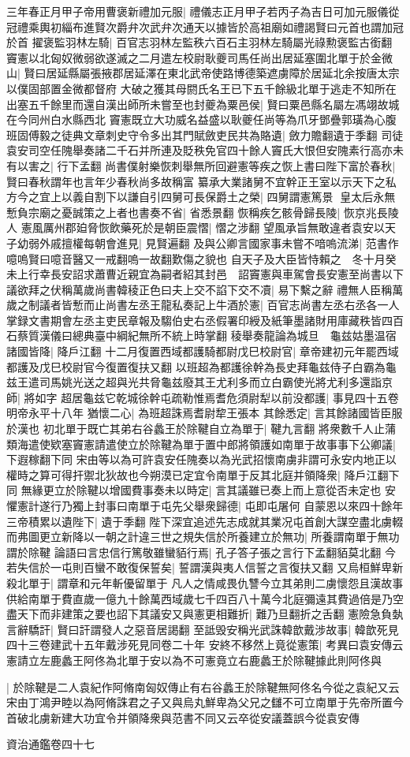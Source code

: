 三年春正月甲子帝用曹褒新禮加元服|{
	禮儀志正月甲子若丙子為吉日可加元服儀從冠禮乘輿初緇布進賢次爵弁次武弁次通天以據皆於高祖廟如禮謁賢曰元首也謂加冠於首}
擢褒監羽林左騎|{
	百官志羽林左監秩六百石主羽林左騎屬光祿勲褒監古銜翻}
竇憲以北匈奴微弱欲遂滅之二月遣左校尉耿夔司馬任尚出居延塞圍北單于於金微山|{
	賢曰居延縣屬張掖郡居延澤在東北武帝使路博德築遮虜障於居延北余按唐太宗以僕固部置金微都督府}
大破之獲其母閼氏名王已下五千餘級北單于逃走不知所在出塞五千餘里而還自漢出師所未嘗至也封夔為粟邑侯|{
	賢曰粟邑縣名屬左馮翊故城在今同州白水縣西北}
竇憲既立大功威名益盛以耿夔任尚等為爪牙鄧疊郭璜為心腹班固傅毅之徒典文章刺史守令多出其門賦斂吏民共為賂遺|{
	斂力贍翻遺于季翻}
司徒袁安司空任隗舉奏諸二千石并所連及貶秩免官四十餘人竇氏大恨但安隗素行高亦未有以害之|{
	行下孟翻}
尚書僕射樂恢刺舉無所回避憲等疾之恢上書曰陛下富於春秋|{
	賢曰春秋謂年也言年少春秋尚多故稱富}
纂承大業諸舅不宜幹正王室以示天下之私方今之宜上以義自割下以謙自引四舅可長保爵土之榮|{
	四舅謂憲篤景}
皇太后永無慙負宗廟之憂誠策之上者也書奏不省|{
	省悉景翻}
恢稱疾乞骸骨歸長陵|{
	恢京兆長陵人}
憲風厲州郡廹脅恢飲藥死於是朝臣震慴|{
	慴之涉翻}
望風承旨無敢違者袁安以天子幼弱外戚擅權每朝會進見|{
	見賢遍翻}
及與公卿言國家事未嘗不喑嗚流涕|{
	范書作噫嗚賢曰噫音醫又一戒翻嗚一故翻歎傷之貌也}
自天子及大臣皆恃賴之　冬十月癸未上行幸長安詔求蕭曹近親宜為嗣者紹其封邑　詔竇憲與車駕會長安憲至尚書以下議欲拜之伏稱萬歲尚書韓稜正色曰夫上交不諂下交不凟|{
	易下繫之辭}
禮無人臣稱萬歲之制議者皆慙而止尚書左丞王龍私奏記上牛酒於憲|{
	百官志尚書左丞右丞各一人掌録文書期會左丞主吏民章報及騶伯史右丞假署印綬及紙筆墨諸財用庫藏秩皆四百石蔡質漢儀曰總典臺中綱紀無所不統上時掌翻}
稜舉奏龍論為城旦　龜兹姑墨温宿諸國皆降|{
	降戶江翻}
十二月復置西域都護騎都尉戊巳校尉官|{
	章帝建初元年罷西域都護及戊巳校尉官今復置復扶又翻}
以班超為都護徐幹為長史拜龜兹侍子白霸為龜兹王遣司馬姚光送之超與光共脅龜兹廢其王尤利多而立白霸使光將尤利多還詣京師|{
	將如字}
超居龜兹它乾城徐幹屯疏勒惟焉耆危須尉犁以前没都護|{
	事見四十五卷明帝永平十八年}
猶懷二心|{
	為班超誅焉耆尉犂王張本}
其餘悉定|{
	言其餘諸國皆臣服於漢也}
初北單于既亡其弟右谷蠡王於除鞬自立為單于|{
	鞬九言翻}
將衆數千人止蒲類海遣使欵塞竇憲請遣使立於除鞬為單于置中郎將領護如南單于故事事下公卿議|{
	下遐稼翻下同}
宋由等以為可許袁安任隗奏以為光武招懷南虜非謂可永安内地正以權時之算可得扞禦北狄故也今朔漠已定宜令南單于反其北庭并領降衆|{
	降戶江翻下同}
無緣更立於除鞬以增國費事奏未以時定|{
	言其議雖已奏上而上意從否未定也}
安懼憲計遂行乃獨上封事曰南單于屯先父舉衆歸德|{
	屯即屯屠何}
自蒙恩以來四十餘年三帝積累以遺陛下|{
	遺于季翻}
陛下深宜追述先志成就其業况屯首創大謀空盡北虜輟而弗圖更立新降以一朝之計違三世之規失信於所養建立於無功|{
	所養謂南單于無功謂於除鞬}
論語曰言忠信行篤敬雖蠻貊行焉|{
	孔子答子張之言行下孟翻貊莫北翻}
今若失信於一屯則百蠻不敢復保誓矣|{
	誓謂漢與夷人信誓之言復扶又翻}
又烏桓鮮卑新殺北單于|{
	謂章和元年斬優留單于}
凡人之情咸畏仇讐今立其弟則二虜懷怨且漢故事供給南單于費直歲一億九十餘萬西域歲七千四百八十萬今北庭彌遠其費過倍是乃空盡天下而非建策之要也詔下其議安又與憲更相難折|{
	難乃旦翻折之舌翻}
憲險急負埶言辭驕訐|{
	賢曰訐謂發人之惡音居謁翻}
至詆毁安稱光武誅韓歆戴涉故事|{
	韓歆死見四十三卷建武十五年戴涉死見同卷二十年}
安終不移然上竟從憲策|{
	考異曰袁安傳云憲請立左鹿蠡王阿佟為北單于安以為不可憲竟立右鹿蠡王於除鞬據此則阿佟與}


|{
	於除鞬是二人袁紀作阿脩南匈奴傳止有右谷蠡王於除鞬無阿佟名今從之袁紀又云宋由丁鴻尹睦以為阿脩誅君之子又與烏丸鮮卑為父兄之讎不可立南單于先帝所置今首破北虜新建大功宜令并領降衆與范書不同又云卒從安議蓋誤今從袁安傳}


資治通鑑卷四十七
